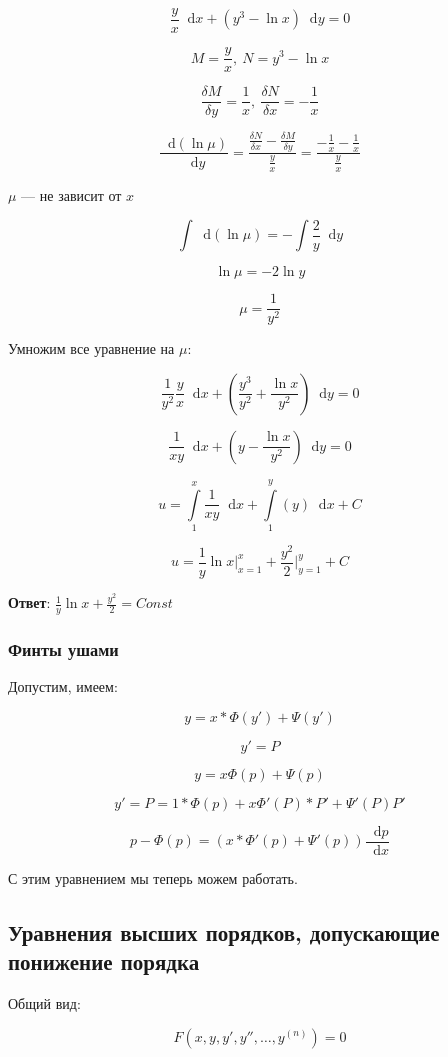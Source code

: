 \documentclass{article}
\newcommand*\diff{\mathop{}\!\mathrm{d}}
\begin{document}
$$\frac{y}{x} \diff x + (y^3 - \ln x) \diff y = 0$$

$$M = \frac{y}{x}, \ N = y^3 - \ln x$$

$$\frac{\delta M}{\delta y} = \frac{1}{x}, \ \frac{\delta N}{\delta x} = - \frac{1}{x}$$

$$\frac{\diff (\ln \mu)}{\diff y} = \frac{\frac{\delta N}{\delta x} - \frac{\delta M}{\delta y}}{\frac{y}{x}} = \frac{-\frac{1}{x} - \frac{1}{x}}{\frac{y}{x}}$$

$\mu$ — не зависит от $x$

$$\int \diff (\ln \mu) = - \int \frac{2}{y} \diff y$$

$$\ln \mu = -2 \ln y$$

$$\mu = \frac{1}{y^2}$$

Умножим все уравнение на $\mu$:

$$\frac{1}{y^2} \frac{y}{x} \diff x + (\frac{y^3}{y^2} + \frac{\ln x}{y^2}) \diff y = 0$$

$$\frac{1}{xy}{\diff x} + (y - \frac{\ln x}{y^2}) \diff y = 0$$

$$u = \int\limits_{1}^{x} \frac{1}{xy} \diff x + \int\limits_{1}^{y} (y ) \diff x + C$$

$$u = \frac{1}{y} \ln x \bigg|_{x = 1}^{x} + \frac{y^2}{2} \bigg|_{y = 1}^{y} + C$$

\textbf{Ответ}: $\frac{1}{y} \ln x + \frac{y^2}{2} = Const$

\subsubsection{Финты ушами}

Допустим, имеем:

$$y = x * \Phi (y') + \Psi (y')$$

$$y' = P$$

$$y = x \Phi (p) + \Psi(p)$$

$$y' = P = 1 * \Phi (p) + x \Phi'(P) * P' + \Psi' (P) P'$$

$$p - \Phi(p) = (x * \Phi'(p) + \Psi'(p)) \frac{\diff p}{\diff x}$$

С этим уравнением мы теперь можем работать.

\subsection{Уравнения высших порядков, допускающие понижение порядка}

Общий вид:

$$F(x, y, y', y'', \dots, y^{(n)}) = 0$$
\end{document}
